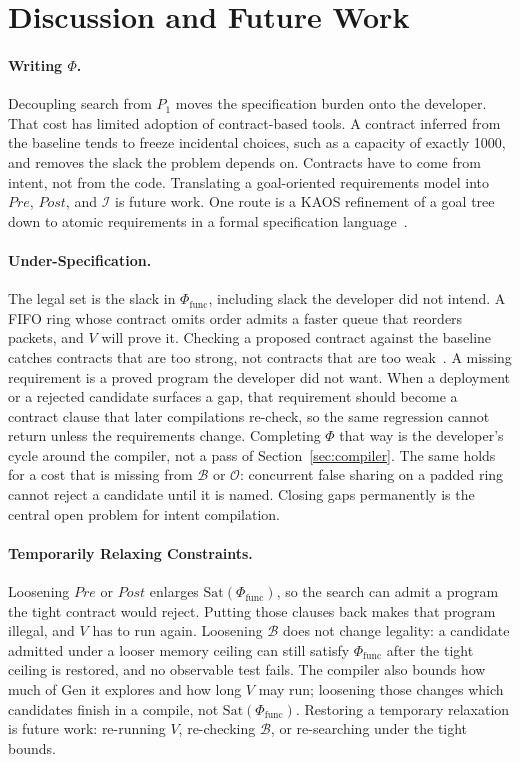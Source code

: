 \section{Discussion and Future Work}
\label{sec:discussion}

\paragraph{Writing \(\Phi\).}
Decoupling search from \(P_1\) moves the specification burden onto the
developer. That cost has limited adoption of contract-based tools.
A contract inferred from the baseline tends to freeze incidental choices,
such as a capacity of exactly 1000, and removes the slack the problem
depends on. Contracts have to come from intent, not from the code.
Translating a goal-oriented requirements model into \(\mathit{Pre}\),
\(\mathit{Post}\), and \(\mathcal{I}\) is future work. One route is a
KAOS refinement of a goal tree down to atomic requirements in a formal
specification language~\cite{vanlamsweerde2001gore}.

\paragraph{Under-Specification.}
The legal set is the slack in \(\Phi_{\text{func}}\), including slack the
developer did not intend. A FIFO ring whose contract omits order admits a
faster queue that reorders packets, and \(V\) will prove it. Checking a
proposed contract against the baseline catches contracts that are too
strong, not contracts that are too weak~\cite{misu2026specharness}. A missing
requirement is a proved program the developer did not want. When a
deployment or a rejected candidate surfaces a gap, that requirement
should become a contract clause that later compilations re-check, so the
same regression cannot return unless the requirements change. Completing
\(\Phi\) that way is the developer's cycle around the compiler, not a
pass of Section~\ref{sec:compiler}. The same holds for a cost that is
missing from \(\mathcal{B}\) or \(\mathcal{O}\): concurrent false sharing
on a padded ring cannot reject a candidate until it is named. Closing
gaps permanently is the central open problem for intent compilation.

\paragraph{Temporarily Relaxing Constraints.}
Loosening \(\mathit{Pre}\) or \(\mathit{Post}\) enlarges
\(\mathrm{Sat}(\Phi_{\text{func}})\), so the search can admit a program the
tight contract would reject. Putting those clauses back makes that program
illegal, and \(V\) has to run again. Loosening \(\mathcal{B}\) does not
change legality: a candidate admitted under a looser memory ceiling can
still satisfy \(\Phi_{\text{func}}\) after the tight ceiling is restored,
and no observable test fails. The compiler also bounds how much of
\(\mathrm{Gen}\) it explores and how long \(V\) may run; loosening those
changes which candidates finish in a compile, not
\(\mathrm{Sat}(\Phi_{\text{func}})\). Restoring a temporary relaxation is
future work: re-running \(V\), re-checking \(\mathcal{B}\), or re-searching
under the tight bounds.

